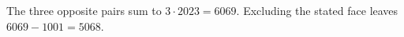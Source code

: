 The three opposite pairs sum to $3\cdot2023=6069$. Excluding the stated face leaves $6069-1001=\boxed{5068}$.
